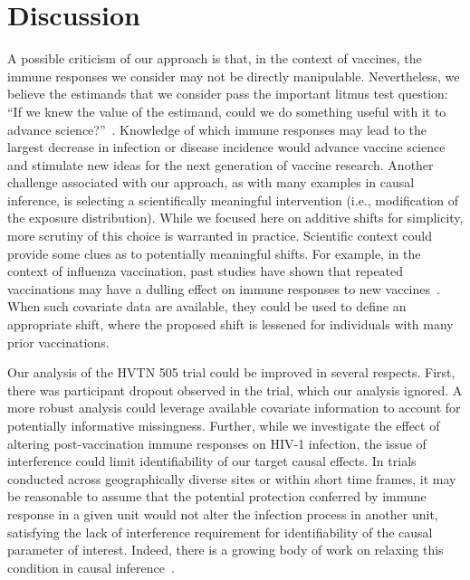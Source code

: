 \section{Discussion}\label{discuss}

A possible criticism of our approach is that, in the context of vaccines, the
immune responses we consider may not be directly manipulable. Nevertheless, we
believe the estimands that we consider pass the important litmus test question:
``If we knew the value of the estimand, could we do something useful with it to
advance science?''~\citep{gilbert2011commentary}. Knowledge of which immune
responses may lead to the largest decrease in infection or disease incidence
would advance vaccine science and stimulate new ideas for the next generation of
vaccine research. Another challenge associated with our approach, as with many
examples in causal inference, is selecting a scientifically meaningful
intervention (i.e., modification of the exposure distribution). While we focused
here on additive shifts for simplicity, more scrutiny of this choice is
warranted in practice. Scientific context could provide some clues as to
potentially meaningful shifts. For example, in the context of influenza
vaccination, past studies have shown that repeated vaccinations may have
a dulling effect on immune responses to new
vaccines~\citep{thompson2016effects}. When such covariate data are available,
they could be used to define an appropriate shift, where the proposed shift is
lessened for individuals with many prior vaccinations.

Our analysis of the HVTN 505 trial could be improved in several respects. First,
there was participant dropout observed in the trial, which our analysis ignored.
A more robust analysis could leverage available covariate information to account
for potentially informative missingness. Further, while we investigate the
effect of altering post-vaccination immune responses on HIV-1 infection, the
issue of interference could limit identifiability of our target causal effects.
In trials conducted across geographically diverse sites or within short time
frames, it may be reasonable to assume that the potential protection conferred
by immune response in a given unit would not alter the infection process in
another unit, satisfying the lack of interference requirement for
identifiability of the causal parameter of interest. Indeed, there is a growing
body of work on relaxing this condition in causal
inference~\citep[e.g.,][]{hudgens2008toward}.

